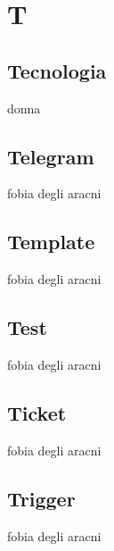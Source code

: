 \section{T} 
\subsection{Tecnologia} 
donna
\subsection{Telegram} 
fobia degli aracni
\subsection{Template} 
fobia degli aracni
\subsection{Test} 
fobia degli aracni
\subsection{Ticket} 
fobia degli aracni
\subsection{Trigger} 
fobia degli aracni
